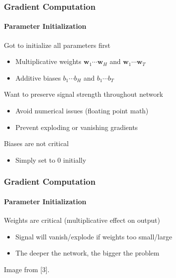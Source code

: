 \documentclass[xetex,professionalfont]{beamer}
\renewcommand\emph[1]{\textcolor{tuwcvl_cvl_blue}{#1}}
\renewcommand{\vec}[1]{\ensuremath{\mathbf{#1}}}
\newcommand{\vw}{\vec{w}}
\begin{document}
\begin{frame}
\frametitle{Gradient Computation}
\framesubtitle{Parameter Initialization}

Got to initialize all parameters first
\begin{itemize}
  \item Multiplicative \emph{weights} $\vw_1\cdots\vw_H$ and $\vw_1\cdots\vw_T$ %
  \item Additive \emph{biases} $b_1\cdots b_H$ and $b_1\cdots b_T$ %
\end{itemize}

\bigskip

Want to preserve signal strength throughout network
\begin{itemize}
  \item Avoid numerical issues (floating point math)
  \item Prevent \emph{exploding} or \emph{vanishing gradients}
\end{itemize}
  
\bigskip

Biases are not critical
\begin{itemize}
  \item Simply set to $0$ initially
\end{itemize}
  
  \end{frame}


\begin{frame}
\frametitle{Gradient Computation}
\framesubtitle{Parameter Initialization}

Weights are critical (multiplicative effect on output)
\begin{itemize}
  \item Signal will vanish/explode if weights too small/large
  \item The deeper the network, the bigger the problem
\end{itemize}

\medskip

\begin{center}
  {\centering Image from [3].}
\end{center}
  
\end{frame}
\end{document}
